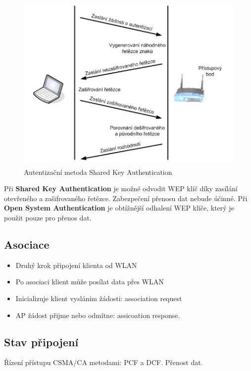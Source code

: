\begin{figure}[ht]
\centering
  \begin{center}
    \includegraphics[scale=0.5]{BPC-HWS/images/SKA.png}
  \end{center}
  \caption[Autentizační metoda Shared Key Authentication]{Autentizační metoda Shared Key Authentication}
\end{figure}
Při \textbf{Shared Key Authentication} je možné odvodit WEP klíč díky zasílání otevřeného a zašifrovaného řetězce. Zabezpečení přenosu dat nebude účinné. Při \textbf{Open System Authentication} je obtížnější odhalení WEP klíče, který je použit pouze pro přenos dat.
\subsection{Asociace}
\begin{itemize}
    \item Druhý krok připojení klienta od WLAN
    \item Po asociaci klient může posílat data přes WLAN
    \item Inicializuje klient vysláním žádosti: association request
    \item AP žádost přijme nebo odmítne: assicoation response.
\end{itemize}
\subsection{Stav připojení}
Řízení přístupu CSMA/CA metodami: PCF a DCF. Přenost dat.

